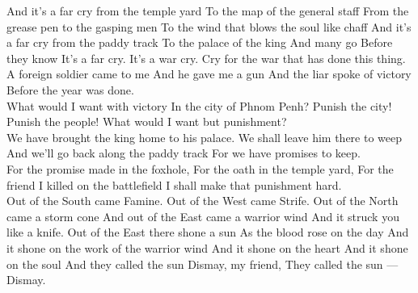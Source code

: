 \begin{poem}
 And it's a far cry from the temple yard
 To the map of the general staff
  From the grease pen to the gasping men
 To the wind that blows the soul like chaff
 And it's a far cry from the paddy track
 To the palace of the king
 And many go
 Before they know
 It's a far cry.
 It's a war cry.
 Cry for the war that has done this thing.\\
 
 A foreign soldier came to me
 And he gave me a gun
 And the liar spoke of victory
 Before the year was done.\\
 
 What would I want with victory
 In the city of Phnom Penh?
 Punish the city! Punish the people!
 What would I want but punishment?\\
 
 We have brought the king home to his palace.
 We shall leave him there to weep
 And we'll go back along the paddy track
 For we have promises to keep.\\
 
 For the promise made in the foxhole,
 For the oath in the temple yard,
 For the friend I killed on the battlefield
 I shall make that punishment hard.\\
 
 Out of the South came Famine.
 Out of the West came Strife.
 Out of the North came a storm cone
 And out of the East came a warrior wind
 And it struck you like a knife.
 Out of the East there shone a sun
 As the blood rose on the day
 And it shone on the work of the warrior wind
 And it shone on the heart
 And it shone on the soul
 And they called the sun Dismay, my friend,
 They called the sun --- Dismay.\\

\end{poem}

